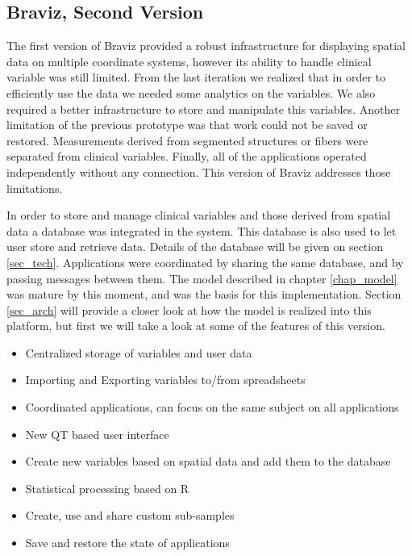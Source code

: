 
\subsection{Braviz, Second Version}


The first version of Braviz provided a robust infrastructure for displaying spatial data on multiple coordinate systems, however its ability to handle clinical variable was still limited. From the last iteration we realized that in order to efficiently use the data we needed some analytics on the variables. We also required a better infrastructure to store and manipulate this variables. Another limitation of the previous prototype was that work could not be saved or restored. Measurements derived from segmented structures or fibers were separated from clinical variables. Finally, all of the applications operated independently without any connection. This version of Braviz addresses those limitations. 

In order to store and manage clinical variables and those derived from spatial data a database was integrated in the system. This database is also used to let user store and retrieve data. Details of the database will be given on section \ref{sec_tech}. Applications were coordinated by sharing the same database, and by passing messages between them. The model described in chapter \ref{chap_model} was mature by this moment, and was the basis for this implementation. Section \ref{sec_arch} will provide a closer look at how the model is realized into this platform, but first we will take a look at some of the features of this version.

\begin{itemize}
	\item Centralized storage of variables and user data
	\item Importing and Exporting variables to/from spreadsheets
	\item Coordinated applications, can focus on the same subject on all applications
	\item New QT based user interface
	\item Create new variables based on spatial data and add them to the database
	\item Statistical processing based on R
	\item Create, use and share custom sub-samples
	\item Save and restore the state of applications
\end{itemize}


